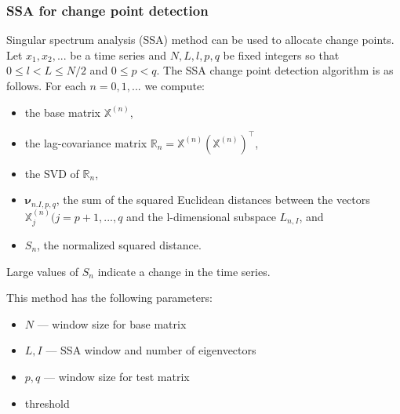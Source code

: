 \documentclass[intlimits, 9pt, unicode]{beamer}
\begin{document}
\begin{frame}
    \frametitle{SSA for change point detection}

Singular spectrum analysis (SSA) method can be used to allocate change points.
Let $x_1,x_2,...$ be a time series and $N, L, l, p, q$ be fixed integers so that $0 \leq l < L \leq N/2$ and $ 0 \leq p < q$. The SSA change point detection algorithm is as follows.
For each $ n = 0,1,...$ we compute:
    \begin{itemize}
    	\item the base matrix $\mathbb{X}^{(n)}$,
	\item the lag-covariance matrix $\mathbb{R}_n = \mathbb{X}^{(n)}(\mathbb{X}^{(n)})^{\top}$,
	\item the SVD of $\mathbb{R}_n$,
	\item $\mathbf{\nu}_{n.I,p,q}$, the sum of the squared Euclidean distances between the vectors $\mathbb{X}_j^{(n)} (j = p+1,...,q$ and the l-dimensional subspace $L_{n,I}$, and
	\item $S_n$, the normalized squared distance.
    \end{itemize}
 Large values of $S_n$ indicate a change in the time series.

This method has the following parameters:
	\begin{itemize}
		\item $N$ --- window size for base matrix
		\item $L, I$ --- SSA window and number of eigenvectors
		\item $p, q$ --- window size for test matrix
		\item threshold
	\end{itemize}
\end{frame}
\end{document}

